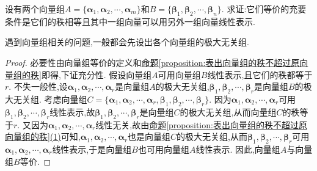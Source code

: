 \documentclass[../../main.tex]{subfiles}%
\begin{document}
\begin{proposition}[向量组等价的充要条件]\label{proposition:向量组等价的充要条件}
设有两个向量组\(A = \{\boldsymbol{\alpha}_1,\boldsymbol{\alpha}_2,\cdots,\boldsymbol{\alpha}_m\}\)和\(B = \{\boldsymbol{\beta}_1,\boldsymbol{\beta}_2,\cdots,\boldsymbol{\beta}_n\}\). 求证:它们等价的充要条件是它们的秩相等且其中一组向量可以用另外一组向量线性表示.
\end{proposition}
\begin{note}
遇到向量组相关的问题,一般都会先设出各个向量组的极大无关组.
\end{note}
\begin{proof}
必要性由向量组等价的定义和\hyperref[proposition:表出向量组的秩不超过原向量组的秩]{命题\ref{proposition:表出向量组的秩不超过原向量组的秩}}即得,下证充分性. 假设向量组\(A\)可用向量组\(B\)线性表示,且它们的秩都等于\(r\). 不失一般性,设\(\boldsymbol{\alpha}_1,\boldsymbol{\alpha}_2,\cdots,\boldsymbol{\alpha}_r\)是向量组\(A\)的极大无关组,\(\boldsymbol{\beta}_1,\boldsymbol{\beta}_2,\cdots,\boldsymbol{\beta}_r\)是向量组\(B\)的极大无关组. 考虑向量组\(C = \{\boldsymbol{\alpha}_1,\boldsymbol{\alpha}_2,\cdots,\boldsymbol{\alpha}_r,\boldsymbol{\beta}_1,\boldsymbol{\beta}_2,\cdots,\boldsymbol{\beta}_r\}\). 因为\(\boldsymbol{\alpha}_1,\boldsymbol{\alpha}_2,\cdots,\boldsymbol{\alpha}_r\)可用\(\boldsymbol{\beta}_1,\boldsymbol{\beta}_2,\cdots,\boldsymbol{\beta}_r\)线性表示,故\(\boldsymbol{\beta}_1,\boldsymbol{\beta}_2,\cdots,\boldsymbol{\beta}_r\)是向量组\(C\)的极大无关组,从而向量组\(C\)的秩等于\(r\). 又因为\(\boldsymbol{\alpha}_1,\boldsymbol{\alpha}_2,\cdots,\boldsymbol{\alpha}_r\)线性无关,故由\hyperref[proposition:表出向量组的秩不超过原向量组的秩]{命题\ref{proposition:表出向量组的秩不超过原向量组的秩}(1)}可知,\(\boldsymbol{\alpha}_1,\boldsymbol{\alpha}_2,\cdots,\boldsymbol{\alpha}_r\)也是向量组\(C\)的极大无关组,从而\(\boldsymbol{\beta}_1,\boldsymbol{\beta}_2,\cdots,\boldsymbol{\beta}_r\)可用\(\boldsymbol{\alpha}_1,\boldsymbol{\alpha}_2,\cdots,\boldsymbol{\alpha}_r\)线性表示,于是向量组\(B\)也可用向量组\(A\)线性表示. 因此,向量组\(A\)与向量组\(B\)等价. \end{proof}
\end{document}
